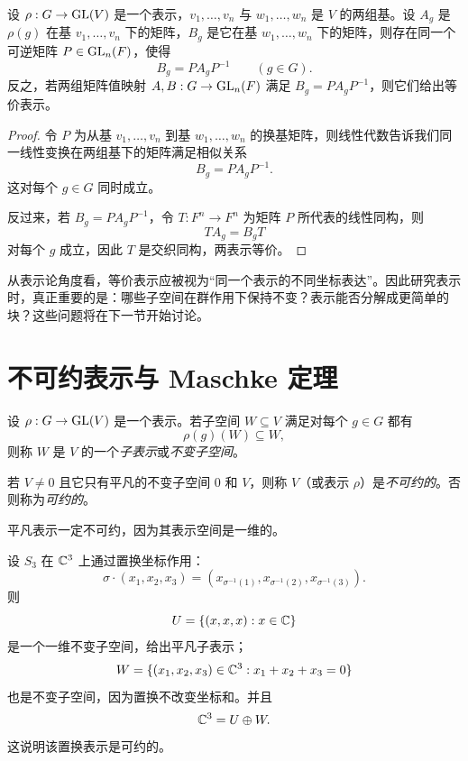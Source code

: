 \begin{proposition}
设 $\rho:G\to \mathrm{GL}(V)$ 是一个表示，$v_1,\dots,v_n$ 与 $w_1,\dots,w_n$ 是 $V$ 的两组基。设 $A_g$ 是 $\rho(g)$ 在基 $v_1,\dots,v_n$ 下的矩阵，$B_g$ 是它在基 $w_1,\dots,w_n$ 下的矩阵，则存在同一个可逆矩阵 $P\in \mathrm{GL}_n(F)$，使得
\[
B_g=PA_gP^{-1}\qquad (g\in G).
\]
反之，若两组矩阵值映射 $A,B:G\to \mathrm{GL}_n(F)$ 满足 $B_g=PA_gP^{-1}$，则它们给出等价表示。
\end{proposition}

\begin{proof}
令 $P$ 为从基 $v_1,\dots,v_n$ 到基 $w_1,\dots,w_n$ 的换基矩阵，则线性代数告诉我们同一线性变换在两组基下的矩阵满足相似关系
\[
B_g=PA_gP^{-1}.
\]
这对每个 $g\in G$ 同时成立。

反过来，若 $B_g=PA_gP^{-1}$，令 $T:F^n\to F^n$ 为矩阵 $P$ 所代表的线性同构，则
\[
TA_g=B_gT
\]
对每个 $g$ 成立，因此 $T$ 是交织同构，两表示等价。
\end{proof}

\begin{remark}
从表示论角度看，等价表示应被视为“同一个表示的不同坐标表达”。因此研究表示时，真正重要的是：哪些子空间在群作用下保持不变？表示能否分解成更简单的块？这些问题将在下一节开始讨论。
\end{remark}

\section{不可约表示与 Maschke 定理}

\begin{definition}
设 $\rho:G\to \mathrm{GL}(V)$ 是一个表示。若子空间 $W\subseteq V$ 满足对每个 $g\in G$ 都有
\[
\rho(g)(W)\subseteq W,
\]
则称 $W$ 是 $V$ 的一个\emph{子表示}或\emph{不变子空间}。

若 $V\neq 0$ 且它只有平凡的不变子空间 $0$ 和 $V$，则称 $V$（或表示 $\rho$）是\emph{不可约的}。否则称为\emph{可约的}。
\end{definition}

\begin{example}
平凡表示一定不可约，因为其表示空间是一维的。
\end{example}

\begin{example}
设 $S_3$ 在 $\mathbb{C}^3$ 上通过置换坐标作用：
\[
\sigma\cdot (x_1,x_2,x_3)=(x_{\sigma^{-1}(1)},x_{\sigma^{-1}(2)},x_{\sigma^{-1}(3)}).
\]
则
\[
U=\{(x,x,x):x\in \mathbb{C}\}
\]
是一个一维不变子空间，给出平凡子表示；
\[
W=\{(x_1,x_2,x_3)\in \mathbb{C}^3:x_1+x_2+x_3=0\}
\]
也是不变子空间，因为置换不改变坐标和。并且
\[
\mathbb{C}^3=U\oplus W.
\]
这说明该置换表示是可约的。
\end{example}

